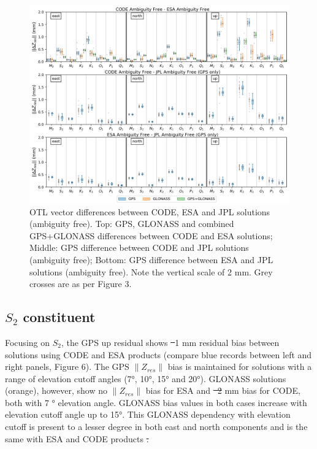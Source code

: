 \documentclass[se, manuscript]{copernicus}
\providecommand{\DIFadd}[1]{{\protect\color{blue}\uwave{#1}}} %
\providecommand{\DIFdel}[1]{{\protect\color{red}\sout{#1}}}                      %
\providecommand{\DIFaddbegin}{} %
\providecommand{\DIFaddend}{} %
\providecommand{\DIFdelbegin}{} %
\providecommand{\DIFdelend}{} %
\begin{document}
\begin{figure}[t]
\includegraphics[width=17cm]{fig05.png}
\caption{OTL vector differences between CODE, ESA and JPL solutions (ambiguity free). Top: GPS, GLONASS and combined GPS+GLONASS differences between CODE and ESA solutions; Middle: GPS difference between CODE and JPL solutions (ambiguity free); Bottom: GPS difference between ESA and JPL solutions (ambiguity free). Note the vertical scale of 2 mm. Grey crosses are as per Figure 3. }
\end{figure}

\subsection{$S_2$ constituent}
Focusing on $S_2$, the GPS up residual shows \DIFdelbegin \DIFdel{~}\DIFdelend \DIFaddbegin \DIFadd{$\sim$}\DIFaddend 1 mm residual bias between solutions using CODE and ESA products (compare blue records between left and right panels, Figure 6). The GPS $\|Z_{res}\|$ bias is maintained for solutions with a range of elevation cutoff angles (7°, 10°, 15° and 20°). GLONASS solutions (orange), however, show no $\|Z_{res}\|$ bias for ESA and \DIFdelbegin \DIFdel{~2 }\DIFdelend \DIFaddbegin \DIFadd{$\sim$1.5 }\DIFaddend mm bias for CODE, both with 7 ° elevation angle. GLONASS bias values in both cases increase with elevation cutoff angle up to 15°. This GLONASS dependency with elevation cutoff is present to a lesser degree in both east and north components and is the same with ESA and CODE products \DIFdelbegin \DIFdel{.
}\DIFdelend \DIFaddbegin \DIFadd{(Fig. S5).
}\DIFaddend 
\end{document}
